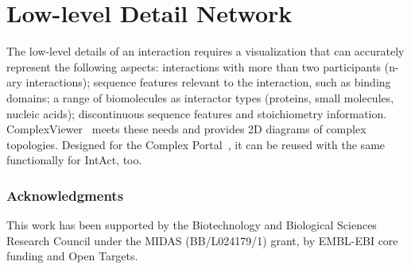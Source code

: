 \documentclass[runningheads]{llncs}
\begin{document}
\section{Low-level Detail Network}
The low-level details of an interaction requires a visualization that can accurately represent the following aspects: interactions with more than two participants (n-ary interactions); sequence features relevant to the interaction, such as binding domains; a range of biomolecules as interactor types (proteins, small molecules, nucleic acids); discontinuous sequence features and stoichiometry information. ComplexViewer~\cite{ref_article1} meets these needs and provides 2D diagrams of complex topologies. Designed for the Complex Portal~\cite{ref_article3}, it can be reused with the same functionally for IntAct, too.

\subsubsection{Acknowledgments}{This work has been supported by the Biotechnology and Biological Sciences Research Council under the MIDAS (BB/L024179/1) grant, by EMBL-EBI core funding and Open Targets.}
\end{document}
